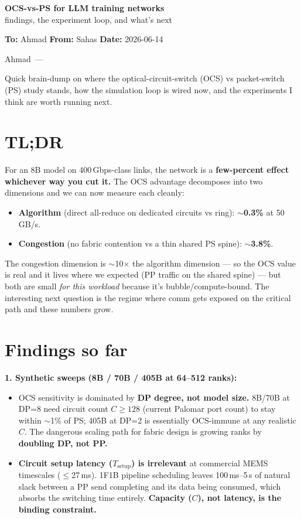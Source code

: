 \documentclass[11pt]{article}
\begin{document}
\begin{center}
{\Large\bfseries OCS-vs-PS for LLM training networks}\\[2pt]
{\normalsize findings, the experiment loop, and what's next}
\end{center}

\vspace{4pt}
\textbf{To:} Ahmad \hfill \textbf{From:} Sahas \hfill \textbf{Date:} 2026-06-14

\vspace{6pt}
Ahmad~---

Quick brain-dump on where the optical-circuit-switch (OCS) vs packet-switch (PS) study stands, how the simulation loop is wired now, and the experiments I think are worth running next.

\section*{TL;DR}

For an 8B model on 400\,Gbps-class links, the network is a \textbf{few-percent effect whichever way you cut it.} The OCS advantage decomposes into two dimensions and we can now measure each cleanly:

\begin{itemize}
\item \textbf{Algorithm} (direct all-reduce on dedicated circuits vs ring): \textbf{$\sim$0.3\%} at 50\,GB/s.
\item \textbf{Congestion} (no fabric contention vs a thin shared PS spine): \textbf{$\sim$3.8\%}.
\end{itemize}

The congestion dimension is $\sim$10$\times$ the algorithm dimension --- so the OCS value is real and it lives where we expected (PP traffic on the shared spine) --- but both are small \textit{for this workload} because it's bubble/compute-bound. The interesting next question is the regime where comm gets exposed on the critical path and these numbers grow.

\section*{Findings so far}

\textbf{1. Synthetic sweeps (8B / 70B / 405B at 64--512 ranks):}
\begin{itemize}
\item OCS sensitivity is dominated by \textbf{DP degree, not model size.} 8B/70B at DP=8 need circuit count $C \geq 128$ (current Palomar port count) to stay within $\sim$1\% of PS; 405B at DP=2 is essentially OCS-immune at any realistic $C$. The dangerous scaling path for fabric design is growing ranks by \textbf{doubling DP, not PP.}
\item \textbf{Circuit setup latency ($T_{\text{setup}}$) is irrelevant} at commercial MEMS timescales ($\leq$27\,ms). 1F1B pipeline scheduling leaves 100\,ms--5\,s of natural slack between a PP send completing and its data being consumed, which absorbs the switching time entirely. \textbf{Capacity ($C$), not latency, is the binding constraint.}
\end{itemize}
\end{document}
